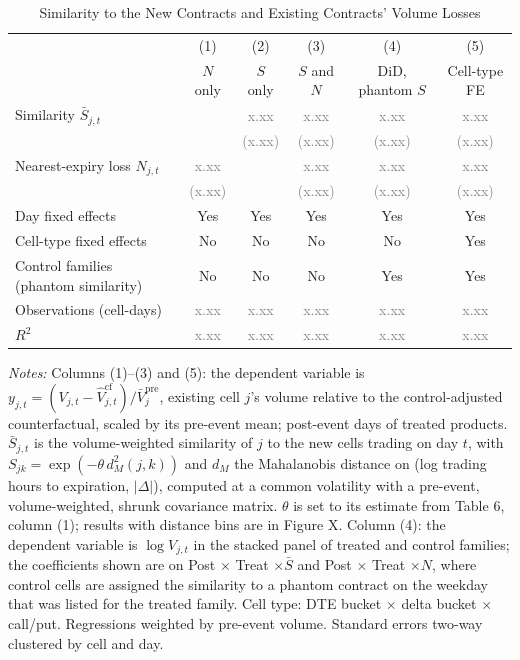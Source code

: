 \documentclass[11pt]{article}
\newcommand{\ph}{\textcolor{gray}{x.xx}}
\newcommand{\phse}{\textcolor{gray}{(x.xx)}}
\begin{document}
\begin{table}[H]
\centering\small
\begin{threeparttable}
\caption{Similarity to the New Contracts and Existing Contracts' Volume Losses}
\begin{tabularx}{\textwidth}{l*{5}{C}}
\toprule
 & (1)        & (2)        & (3)            & (4)              & (5) \\
 & $N$ only   & $S$ only   & $S$ and $N$    & DiD, phantom $S$ & Cell-type FE \\
\midrule
Similarity $\bar S_{j,t}$         &       & \ph   & \ph   & \ph   & \ph \\
                                  &       & \phse & \phse & \phse & \phse \\
Nearest-expiry loss $N_{j,t}$     & \ph   &       & \ph   & \ph   & \ph \\
                                  & \phse &       & \phse & \phse & \phse \\
\midrule
Day fixed effects                    & Yes & Yes & Yes & Yes & Yes \\
Cell-type fixed effects              & No  & No  & No  & No  & Yes \\
Control families (phantom similarity) & No  & No  & No  & Yes & Yes \\
Observations (cell-days)             & \ph & \ph & \ph & \ph & \ph \\
$R^2$                                & \ph & \ph & \ph & \ph & \ph \\
\bottomrule
\end{tabularx}
\begin{tablenotes}
\footnotesize
\item[] \textit{Notes:} Columns (1)--(3) and (5): the dependent variable is $y_{j,t} = (V_{j,t} - \hat V^{\mathrm{cf}}_{j,t})/\bar V^{\mathrm{pre}}_j$, existing cell $j$'s volume relative to the control-adjusted counterfactual, scaled by its pre-event mean; post-event days of treated products. $\bar S_{j,t}$ is the volume-weighted similarity of $j$ to the new cells trading on day $t$, with $S_{jk} = \exp(-\theta\, d_M^2(j,k))$ and $d_M$ the Mahalanobis distance on (log trading hours to expiration, $|\Delta|$), computed at a common volatility with a pre-event, volume-weighted, shrunk covariance matrix. $\theta$ is set to its estimate from Table 6, column (1); results with distance bins are in Figure X. Column (4): the dependent variable is $\log V_{j,t}$ in the stacked panel of treated and control families; the coefficients shown are on Post $\times$ Treat $\times \bar S$ and Post $\times$ Treat $\times N$, where control cells are assigned the similarity to a phantom contract on the weekday that was listed for the treated family. Cell type: DTE bucket $\times$ delta bucket $\times$ call/put. Regressions weighted by pre-event volume. Standard errors two-way clustered by cell and day.
\end{tablenotes}
\end{threeparttable}
\end{table}
\end{document}
